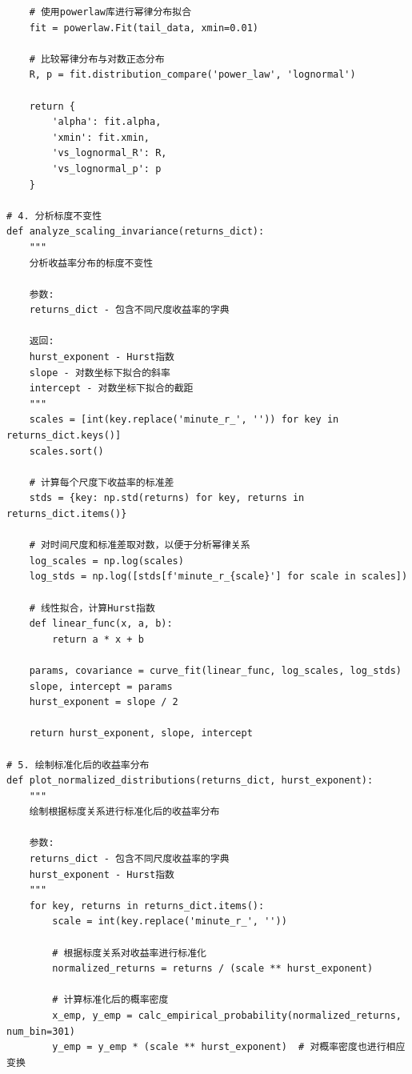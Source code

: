 \documentclass[12pt, a4paper]{article}
\begin{document}
\begin{verbatim}
    # 使用powerlaw库进行幂律分布拟合
    fit = powerlaw.Fit(tail_data, xmin=0.01)
    
    # 比较幂律分布与对数正态分布
    R, p = fit.distribution_compare('power_law', 'lognormal')
    
    return {
        'alpha': fit.alpha,
        'xmin': fit.xmin,
        'vs_lognormal_R': R,
        'vs_lognormal_p': p
    }

# 4. 分析标度不变性
def analyze_scaling_invariance(returns_dict):
    """
    分析收益率分布的标度不变性
    
    参数:
    returns_dict - 包含不同尺度收益率的字典
    
    返回:
    hurst_exponent - Hurst指数
    slope - 对数坐标下拟合的斜率
    intercept - 对数坐标下拟合的截距
    """
    scales = [int(key.replace('minute_r_', '')) for key in returns_dict.keys()]
    scales.sort()
    
    # 计算每个尺度下收益率的标准差
    stds = {key: np.std(returns) for key, returns in returns_dict.items()}
    
    # 对时间尺度和标准差取对数，以便于分析幂律关系
    log_scales = np.log(scales)
    log_stds = np.log([stds[f'minute_r_{scale}'] for scale in scales])
    
    # 线性拟合，计算Hurst指数
    def linear_func(x, a, b):
        return a * x + b
    
    params, covariance = curve_fit(linear_func, log_scales, log_stds)
    slope, intercept = params
    hurst_exponent = slope / 2
    
    return hurst_exponent, slope, intercept

# 5. 绘制标准化后的收益率分布
def plot_normalized_distributions(returns_dict, hurst_exponent):
    """
    绘制根据标度关系进行标准化后的收益率分布
    
    参数:
    returns_dict - 包含不同尺度收益率的字典
    hurst_exponent - Hurst指数
    """
    for key, returns in returns_dict.items():
        scale = int(key.replace('minute_r_', ''))
        
        # 根据标度关系对收益率进行标准化
        normalized_returns = returns / (scale ** hurst_exponent)
        
        # 计算标准化后的概率密度
        x_emp, y_emp = calc_empirical_probability(normalized_returns, num_bin=301)
        y_emp = y_emp * (scale ** hurst_exponent)  # 对概率密度也进行相应变换
\end{verbatim}
\end{document}
